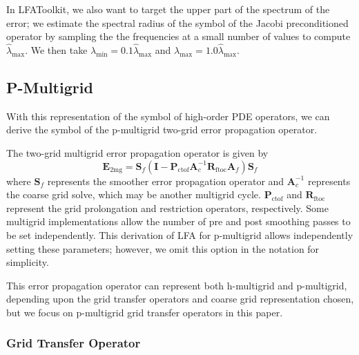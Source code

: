 \documentclass[review]{siamart190516}
\begin{document}
In LFAToolkit, we also want to target the upper part of the spectrum of the error; we estimate the spectral radius of the symbol of the Jacobi preconditioned operator by sampling the the frequencies at a small number of values to compute $\hat{\lambda}_{\text{max}}$.
We then take $\lambda_{\text{min}} = 0.1 \hat{\lambda}_{\text{max}}$ and $\lambda_{\text{max}} = 1.0 \hat{\lambda}_{\text{max}}$.

\subsection{P-Multigrid}\label{sec:multigrid}

With this representation of the symbol of high-order PDE operators, we can derive the symbol of the p-multigrid two-grid error propagation operator.

The two-grid multigrid error propagation operator is given by
\begin{equation}
\mathbf{E}_{\text{2mg}} = \mathbf{S}_f \left( \mathbf{I} - \mathbf{P}_{\text{ctof}} \mathbf{A}_c^{-1} \mathbf{R}_{\text{ftoc}} \mathbf{A}_f \right) \mathbf{S}_f
\end{equation}
where $\mathbf{S}_f$ represents the smoother error propagation operator and $\mathbf{A}_c^{-1}$ represents the coarse grid solve, which may be another multigrid cycle.
$\mathbf{P}_{\text{ctof}}$ and $\mathbf{R}_{\text{ftoc}}$ represent the grid prolongation and restriction operators, respectively.
Some multigrid implementations allow the number of pre and post smoothing passes to be set independently.
This derivation of LFA for p-multigrid allows independently setting these parameters; however, we omit this option in the notation for simplicity.

This error propagation operator can represent both h-multigrid and p-multigrid, depending upon the grid transfer operators and coarse grid representation chosen, but we focus on p-multigrid grid transfer operators in this paper.

\subsubsection{Grid Transfer Operator}\label{sec:grids}
\end{document}
